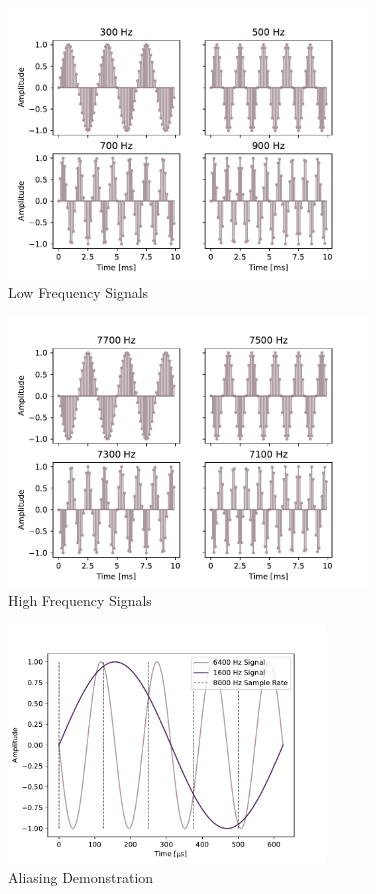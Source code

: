 \documentclass[11pt]{texMemo-gibbons}
\begin{document}
\clearpage

\begin{figure}
  \centering
  \includegraphics[width=0.85\textwidth]{figures/stem_300-500-700-900.pdf}
  \caption{Low Frequency Signals}\label{fig:low_freq_stem}
\end{figure}

\begin{figure}
  \centering
  \includegraphics[width=0.85\textwidth]{figures/stem_7700-7500-7300-7100.pdf}
  \caption{High Frequency Signals}\label{fig:high_freq_stem}
\end{figure}

\begin{figure}
  \centering
  \includegraphics[width=0.75\textwidth]{figures/aliasing.pdf}
  \caption{Aliasing Demonstration}\label{fig:aliasing}
\end{figure}
\end{document}
